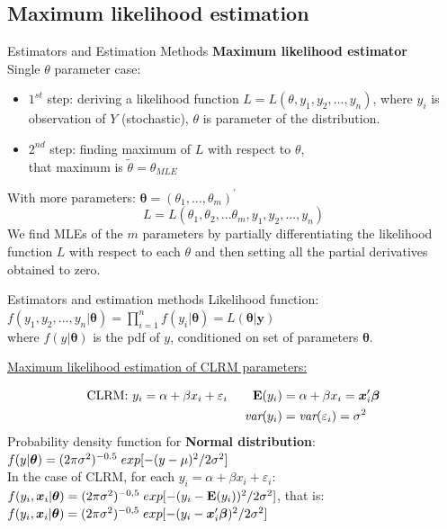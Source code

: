 \documentclass{beamer}
\begin{document}
\subsection{Maximum likelihood estimation}
\begin{frame}{Estimators and Estimation Methods}
\textbf{Maximum likelihood estimator}\\
\medskip
Single $\theta$ parameter case:\\
\begin{itemize}
\item $1^{st}$ step: deriving a likelihood function $L=L(\theta ,y_1, y_2, ... , y_n)$, where $y_i$ is observation of $Y$ (stochastic), $\theta$ is parameter of the distribution.\\
\item $2^{nd}$ step: finding maximum of $L$ with respect to $\theta$, \\that maximum is $\tilde{\theta} = \theta_{MLE}$
\end{itemize}
With more parameters: $\bm{\theta} = (\theta_1, \dots , \theta_m)^{\prime}$
$$L=L(\theta_1, \theta_2, ... \theta_m, y_1, y_2, ... , y_n)$$
We find MLEs of the $m$ parameters by partially differentiating the likelihood function $L$ with respect to each $\theta$ and then setting all the partial derivatives obtained to zero.\\
\end{frame}
\begin{frame}{Estimators and estimation methods}
Likelihood function:\\ 
$f(y_1,y_2,\dots,y_n|\bm{\theta}) = \prod_{i=1}^n f(y_i|\bm{\theta}) = L(\bm{\theta}|\bm{y})$ \\
where $f(y|\bm{\theta})$ is the pdf of $y$, conditioned on set of parameters $\bm{\theta}$.\\
\medskip
\centerline{\underline{Maximum likelihood estimation of CLRM parameters:}}
\begin{align*}
\textnormal{CLRM: } y_i= \alpha + \beta x_i + \varepsilon_i \qquad \mathbf{E}(y_i) & =\alpha +\beta x_i = \bm{x}_i^{\prime}\bm{\beta}\\
\textit{var}(y_i) & =\textit{var}(\varepsilon_i)=\sigma^2
\end{align*}
Probability density function for \textbf{Normal distribution}:\\
\medskip
$f(y|\bm{\theta})=(2\pi\sigma^2)^{-0.5} \hspace{0.1cm} exp[-(y-\mu)^2/2\sigma^2]$\\
\bigskip
In the case of CLRM, for each $y_i=\alpha + \beta x_i + \varepsilon_i$: \\
\medskip
$f(y_i, \bm{x}_i|\bm{\theta})=(2\pi\sigma^2)^{-0,5} \hspace{0.1cm} exp[-(y_i-\mathbf{E}(y_i))^2/2\sigma^2]$, that is:\\
$f(y_i, \bm{x}_i|\bm{\theta})=(2\pi\sigma^2)^{-0,5} \hspace{0.1cm} exp[-(y_i-\bm{x}_i^{\prime}\bm{\beta})^2/2\sigma^2]$

\end{frame}
\end{document}

